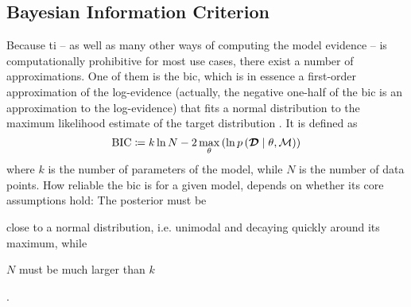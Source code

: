 \documentclass[\relativeRoot/main.tex]{subfiles}
\begin{document}
\subsection*{Bayesian Information Criterion}
\label{subsec:graph:model_comp:bic}

Because \acrlong{ti} -- as well as many other ways of computing the model evidence -- is computationally prohibitive for most use cases, there exist a number of approximations. One of them is the \gls{bic}, which is in essence a first-order approximation of the log-evidence (actually, the negative one-half of the \gls{bic} is an approximation to the log-evidence) that fits a normal distribution to the maximum likelihood estimate of the target distribution \cite{schwarz_estimating_1978}. It is defined as
%
\begin{equation} \label{eq:bic}
    \text{BIC} \coloneqq k \ln{N} - 2 \max_\theta{ \left( \ln{ p \left( \boldsymbol{\mathcal{D}} \mid \theta, \mathcal{M} \right) } \right)}
\end{equation}
%
where $k$ is the number of parameters of the model, while $N$ is the number of data points. How reliable the \gls{bic} is for a given model, depends on whether its core assumptions hold: The posterior must be 
\begin{enumerate*}[label={(\arabic*)}]
    \item close to a normal distribution, i.e. unimodal and decaying quickly around its maximum, while
    \item $N$ must be much larger than $k$
\end{enumerate*}
\cite{bhat_derivation_2010}.
\end{document}
